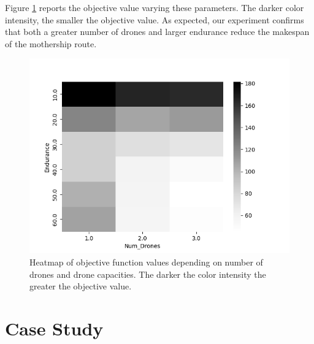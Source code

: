 \documentclass[10pt,a4paper]{elsarticle}
\begin{document}
\noindent
Figure \ref{fig:heatmap} reports the objective value varying these parameters. The darker color intensity, the smaller the objective value. As expected, our experiment confirms that both a greater number of drones and larger endurance reduce the makespan of the mothership route.


\begin{figure}[h!]
\includegraphics[width=\linewidth]{heatmap_gray.png}
\caption{Heatmap of objective function values depending on number of drones and drone capacities. The darker the color intensity the greater the objective value. \label{fig:heatmap}}
\end{figure}
\noindent


\section{Case Study\label{section:CS}}
\end{document}
